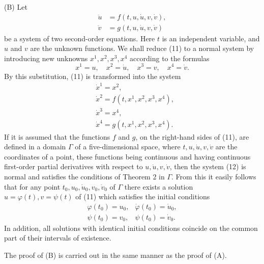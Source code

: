 \documentclass[10pt,a5paper]{book}
\theoremstyle{plain}
\theoremstyle{definition}
\theoremstyle{remark}
\begin{document}
(B) Let
\begin{align*}
\ddot{u} & =f(t, u, \dot{u}, v, \dot{v}),  \tag{11}\\
\ddot{v} & =g(t, u, \dot{u}, v, \dot{v})
\end{align*}
be a system of two second-order equations. Here $t$ is an independent variable, and $u$ and $v$ are the unknown functions. We shall reduce (11) to a normal system by introducing new unknowns $x^{1}, x^{2}, x^{3}, x^{4}$ according to the formulas
\[
x^{1}=u, \quad x^{2}=\dot{u}, \quad x^{3}=v, \quad x^{4}=\dot{v} .
\]
By this substitution, (11) is transformed into the system
\begin{align*}
& \dot{x}^{1}=x^{2}, \\
& \dot{x}^{2}=f\left(t, x^{1}, x^{2}, x^{3}, x^{4}\right),  \tag{12}\\
& \dot{x}^{3}=x^{4}, \\
& \dot{x}^{4}=g\left(t, x^{1}, x^{2}, x^{3}, x^{4}\right) .
\end{align*}
If it is assumed that the functions $f$ and $g$, on the right-hand sides of (11), are defined in a domain $\Gamma$ of a five-dimensional space, where $t, u, \dot{u}, v, \dot{v}$ are the coordinates of a point, these functions being continuous and having continuous first-order partial derivatives with respect to $u, \dot{u}, v, \dot{v}$, then the system (12) is normal and satisfies the conditions of Theorem 2 in $\Gamma$. From this it easily follows that for any point $t_{0}, u_{0}, \dot{u}_{0}, v_{0}, \dot{v}_{0}$ of $\Gamma$ there exists a solution $u=\varphi(t), v=\psi(t)$ of (11) which satisfies the initial conditions
\[
\begin{array}{ll}
\varphi\left(t_{0}\right)=u_{0}, & \dot{\varphi}\left(t_{0}\right)=\dot{u}_{0}, \\
\psi\left(t_{0}\right)=v_{0}, & \psi\left(t_{0}\right)=\dot{v}_{0} .
\end{array}
\]
In addition, all solutions with identical initial conditions coincide on the common part of their intervals of existence.

The proof of (B) is carried out in the same manner as the proof of (A).
\end{document}
